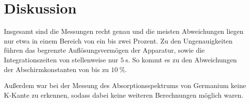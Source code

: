 \section{Diskussion}
\label{sec:Diskussion}

Insgesamt sind die Messungen recht genau und die meisten Abweichungen
liegen nur etwa in einem Bereich von ein bis zwei Prozent. Zu den
Ungenauigkeiten führen das begrenzte Auflösungsvermögen der
Apparatur, sowie die Integrationszeiten von stellenweise nur
$\SI{5}{\second}$. So kommt es zu den Abweichungen der
Abschirmkonstanten von bis zu $\SI{10}{\percent}$.

Außerdem war bei der Messung des Absorptionsspektrums
von Germanium keine K-Kante zu erkennen, sodass dabei keine
weiteren Berechnungen möglich waren.

